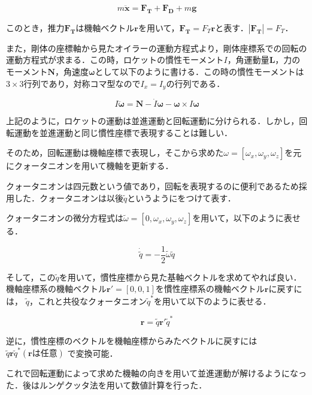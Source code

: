 \documentclass{jsarticle}
\begin{document}
\begin{equation}
m \bm{\ddot{x}} = \bm{F_T} + \bm{F_D} + m\bm{g}
\end{equation}

このとき，推力$\bm{F_T}$は機軸ベクトル$\bm{r}$を用いて，$\bm{F_T} = F_T \bm{r}$と表す．$|\bm{F_T}| = F_T$．


また，剛体の座標軸から見たオイラーの運動方程式より，剛体座標系での回転の運動方程式が求まる．この時，ロケットの慣性モーメント$I$，角運動量$\bm{L}$，力のモーメント$\bm{N}$，角速度$\bm{\omega}$として以下のように書ける．この時の慣性モーメントは$3\times3$行列であり，対称コマ型なので$I_x = I_y$の行列である．

\begin{equation}
I \bm{\ddot{\omega}} = \bm{N} - \dot{I}\bm{\omega} - \bm{\omega} \times I \bm{\omega}
\end{equation}

上記のように，ロケットの運動は並進運動と回転運動に分けられる．しかし，回転運動を並進運動と同じ慣性座標で表現することは難しい．

そのため，回転運動は機軸座標で表現し，そこから求めた$\omega = [\omega_x, \omega_y, \omega_z]$を元にクォータニオンを用いて機軸を更新する．

クォータニオンは四元数という値であり，回転を表現するのに便利であるため採用した．クォータニオンは以後$\tilde{q}$というように$\tilde{}$をつけて表す．

クォータニオンの微分方程式は$\tilde{\omega} = [0, \omega_x, \omega_y, \omega_z]$を用いて，以下のように表せる．

\begin{equation}
\dot{\tilde{q}} = -\frac{1}{2}\tilde{\omega}\tilde{q}
\end{equation}

そして，この$\tilde{q}$を用いて，慣性座標から見た基軸ベクトルを求めてやれば良い．
機軸座標系の機軸ベクトル$\bm{r'} = [0,0,1]$を慣性座標系の機軸ベクトル$\bm{r}$に戻すには，
$\tilde{q}$，これと共役なクォータニオン$\tilde{q}^*$を用いて以下のように表せる．

\begin{equation}
\bm{r} = \tilde{q} \bm{r'} \tilde{q}^*
\end{equation}

逆に，慣性座標のベクトルを機軸座標からみたベクトルに戻すには
$\tilde{q} \bm{r}\tilde{q}^*(\bm{r} は任意)$
で変換可能．

これで回転運動によって求めた機軸の向きを用いて並進運動が解けるようになった．後はルンゲクッタ法を用いて数値計算を行った．
\end{document}
